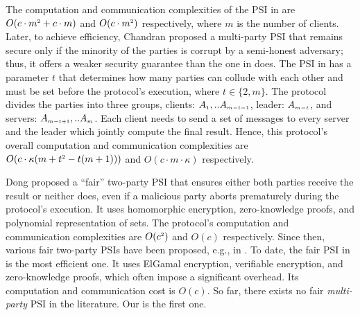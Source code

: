 The computation and communication complexities of the PSI in  \cite{DBLP:conf/ccs/KolesnikovMPRT17} are  $O(c\cdot m^{\scriptscriptstyle 2}+c\cdot m )$ and $O(c\cdot m^{\scriptscriptstyle 2})$ respectively, where $m$ is the number of clients. Later, to achieve efficiency, Chandran \et \cite{ChandranD0OSS21} proposed a multi-party PSI that remains secure only if the minority of the parties is corrupt by a semi-honest adversary; thus, it offers a weaker security guarantee than  the one in \cite{DBLP:conf/ccs/KolesnikovMPRT17} does. The PSI in \cite{NevoTY21} has a parameter $t$ that determines how many parties can collude with each other and must be set before the protocol's execution, where $t\in \{2, m\}$. The protocol divides the parties into three groups, clients: $A_{\scriptscriptstyle 1},..A_{\scriptscriptstyle m-t-1}$, leader: $A_{\scriptscriptstyle m-t}$, and servers: $A_{\scriptscriptstyle m-t+1},..A_{\scriptscriptstyle m}$. Each client needs to send a set of messages to every server and the leader which jointly compute the final result. Hence, this protocol's overall computation and communication complexities are $O(c\cdot \kappa(m+t^{\scriptscriptstyle 2}-t(m+1)))$ and $O(c\cdot m\cdot \kappa)$ respectively.

Dong \et proposed a ``fair'' two-party PSI \cite{DBLP:conf/dbsec/DongCCR13} that ensures either both parties receive the result or neither does, even if a malicious party aborts prematurely during the protocol's execution. It uses homomorphic encryption,  zero-knowledge proofs, and polynomial representation of sets. The protocol's computation and communication complexities are $O(c^{\scriptscriptstyle 2})$ and $O(c)$  respectively. Since then, various fair two-party PSIs have been proposed, e.g.,  in \cite{DebnathD14,DebnathD16-,DebnathD16}. To date, the fair PSI in \cite{DebnathD16} is the most efficient one. It uses ElGamal encryption, verifiable encryption, and zero-knowledge proofs, which often impose a significant overhead. Its computation and communication cost is $O(c)$. So far, there exists no fair \emph{multi-party} PSI in the literature. Our \withFai is the first one.%



